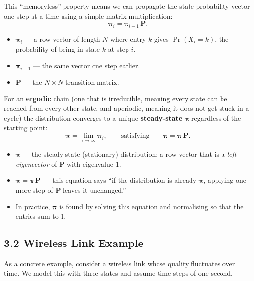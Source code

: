 \documentclass[12pt, a4paper]{article}
\begin{document}
This ``memoryless'' property means we can propagate the state-probability
vector one step at a time using a simple matrix multiplication:
\[
  \boldsymbol{\pi}_i = \boldsymbol{\pi}_{i-1}\,\mathbf{P}.
\]
\begin{itemize}[leftmargin=1.4em, itemsep=2pt]
  \item $\boldsymbol{\pi}_i$ --- a row vector of length $N$ where entry $k$
    gives $\Pr(X_i = k)$, the probability of being in state $k$ at step $i$.
  \item $\boldsymbol{\pi}_{i-1}$ --- the same vector one step earlier.
  \item $\mathbf{P}$ --- the $N \times N$ transition matrix.
\end{itemize}

For an \textbf{ergodic} chain (one that is irreducible, meaning every state
can be reached from every other state, and aperiodic, meaning it does not get
stuck in a cycle) the distribution converges to a unique
\textbf{steady-state} $\boldsymbol{\pi}$ regardless of the starting point:
\[
  \boldsymbol{\pi} = \lim_{i \to \infty} \boldsymbol{\pi}_i,
  \qquad \text{satisfying} \qquad
  \boldsymbol{\pi} = \boldsymbol{\pi}\,\mathbf{P}.
\]
\begin{itemize}[leftmargin=1.4em, itemsep=2pt]
  \item $\boldsymbol{\pi}$ --- the steady-state (stationary) distribution; a
    row vector that is a \emph{left eigenvector} of $\mathbf{P}$ with
    eigenvalue 1.
  \item $\boldsymbol{\pi} = \boldsymbol{\pi}\,\mathbf{P}$ --- this equation
    says ``if the distribution is already $\boldsymbol{\pi}$, applying one
    more step of $\mathbf{P}$ leaves it unchanged.''
  \item In practice, $\boldsymbol{\pi}$ is found by solving this equation and
    normalising so that the entries sum to 1.
\end{itemize}

\subsection*{3.2 \quad Wireless Link Example}

As a concrete example, consider a wireless link whose quality fluctuates over
time. We model this with three states and assume time steps of one second.
\end{document}
